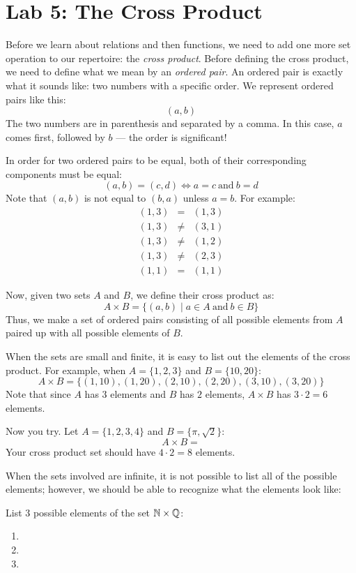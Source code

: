 \documentclass[letterpaper,12pt,fleqn]{article}
\begin{document}
\section*{Lab 5: The Cross Product}

Before we learn about relations and then functions, we need to add one more set operation
to our repertoire: the \emph{cross product}. Before defining the cross product, we need to
define what we mean by an \emph{ordered pair}. An ordered pair is exactly what it sounds
like: two numbers with a specific order. We represent ordered pairs like this:
\[(a,b)\]
The two numbers are in parenthesis and separated by a comma. In this case, $a$ comes
first, followed by $b$ --- the order is significant!

In order for two ordered pairs to be equal, both of their corresponding components must
be equal:
\[(a,b)=(c,d)\iff a=c\ \mbox{and}\ b=d\]
Note that $(a,b)$ is not equal to $(b,a)$ unless $a=b$. For example:
\begin{eqnarray*}
(1,3) &=& (1,3) \\
(1,3) &\ne& (3,1) \\
(1,3) &\ne& (1,2) \\
(1,3) &\ne& (2,3) \\
(1,1) &=& (1,1)
\end{eqnarray*}

Now, given two sets $A$ and $B$, we define their cross product as:
\[A\times B=\{(a,b)\mid a\in A\ \mbox{and}\ b\in B\}\]
Thus, we make a set of ordered pairs consisting of all possible elements from $A$
paired up with all possible elements of $B$.

When the sets are small and finite, it is easy to list out the elements of the cross
product. For example, when $A=\{1, 2, 3\}$ and $B=\{10, 20\}$:
\[A\times B=\{(1,10), (1,20), (2,10), (2,20), (3,10), (3,20)\}\]
Note that since $A$ has $3$ elements and $B$ has $2$ elements, $A\times B$ has
$3\cdot2=6$ elements.

Now you try. Let $A=\{1,2,3,4\}$ and $B=\{\pi,\sqrt{2}\}$:
\[A\times B=\]
Your cross product set should have $4\cdot2=8$ elements.

\newpage

When the sets involved are infinite, it is not possible to list all of the possible
elements; however, we should be able to recognize what the elements look like:

List $3$ possible elements of the set $\mathbb{N}\times\mathbb{Q}$:
\begin{enumerate}
\item
\item
\item
\end{enumerate}
\end{document}

